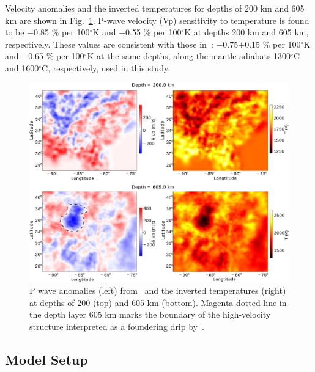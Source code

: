 \documentclass[draft,linenumbers]{agujournal2018}
\begin{document}
Velocity anomalies and the inverted temperatures for depths of 200 km and 605 km are shown in Fig.~\ref{fig_temp}. 
P-wave velocity (Vp) sensitivity to temperature is found to be $-$0.85 \% per 100$^\circ$K and $-$0.55 \% per 100$^\circ$K at depths 200 km and 605 km, respectively. These values are consistent with those in~\citep{Cammarano2003}: $-$0.75$\pm$0.15 \% per 100$^\circ$K and $-$0.65 \% per 100$^\circ$K at the same depths, along the mantle adiabats 1300$^{\circ}$C and 1600$^{\circ}$C, respectively, used in this study.
%
\begin{figure}[ht]
    \centering
    \includegraphics[width=0.75\linewidth]{figures/figure_temp.png}
    \caption{P wave anomalies (left) from~\citet{Biryol_2016} and the inverted temperatures (right) 
    at depths of 200 (top) and 605 km (bottom). Magenta dotted line in the depth layer 605 km marks the boundary of the high-velocity structure interpreted as a foundering drip by~\citet{Biryol_2016}.
    }
    \label{fig_temp}
 \end{figure}

\subsection{Model Setup}
    
\end{document}
